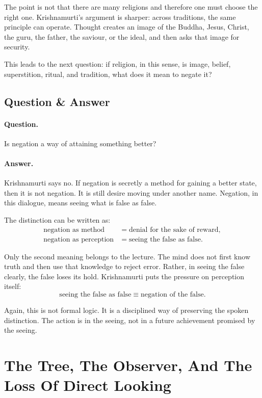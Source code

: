 The point is not that there are many religions and therefore one must choose the right one. Krishnamurti's argument is sharper: across traditions, the same principle can operate. Thought creates an image of the Buddha, Jesus, Christ, the guru, the father, the saviour, or the ideal, and then asks that image for security.

This leads to the next question: if religion, in this sense, is image, belief, superstition, ritual, and tradition, what does it mean to negate it?

\subsection{Question \& Answer}

\paragraph{Question.}
Is negation a way of attaining something better?

\paragraph{Answer.}
Krishnamurti says no. If negation is secretly a method for gaining a better state, then it is not negation. It is still desire moving under another name. Negation, in this dialogue, means seeing what is false as false.

The distinction can be written as:
\begin{align}
\text{negation as method}
&=
\text{denial for the sake of reward},\\
\text{negation as perception}
&=
\text{seeing the false as false}.
\end{align}

Only the second meaning belongs to the lecture. The mind does not first know truth and then use that knowledge to reject error. Rather, in seeing the false clearly, the false loses its hold. Krishnamurti puts the pressure on perception itself:
\begin{equation}
\text{seeing the false as false}
\equiv
\text{negation of the false}.
\end{equation}

Again, this is not formal logic. It is a disciplined way of preserving the spoken distinction. The action is in the seeing, not in a future achievement promised by the seeing.

\section{The Tree, The Observer, And The Loss Of Direct Looking}

